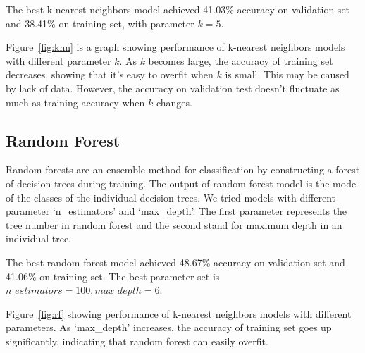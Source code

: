 \documentclass[a4paper, 11pt]{article}
\begin{document}
The best k-nearest neighbors model achieved 41.03\% accuracy on validation set and 38.41\% on training set, with parameter $k = 5$.

Figure~\ref{fig:knn} is a graph showing performance of k-nearest neighbors models with different parameter $k$. As $k$ becomes large, the accuracy of training set decreases, showing that it's easy to overfit when $k$ is small. This may be caused by lack of data. However, the accuracy on validation test doesn't fluctuate as much as training accuracy when $k$ changes.

\subsection*{Random Forest}
Random forests are an ensemble method for classification by constructing a forest of decision trees during training. The output of random forest model is the mode of the classes of the individual decision trees. We tried models with different parameter `n\_estimators' and `max\_depth'. The first parameter represents the tree number in random forest and the second stand for maximum depth in an individual tree.

The best random forest model achieved 48.67\% accuracy on validation set and 41.06\% on training set. The best parameter set is $n\_estimators = 100, max\_depth = 6$.

Figure~\ref{fig:rf} showing performance of k-nearest neighbors models with different parameters. As `max\_depth' increases, the accuracy of training set goes up significantly, indicating that random forest can easily overfit. 
\end{document}
